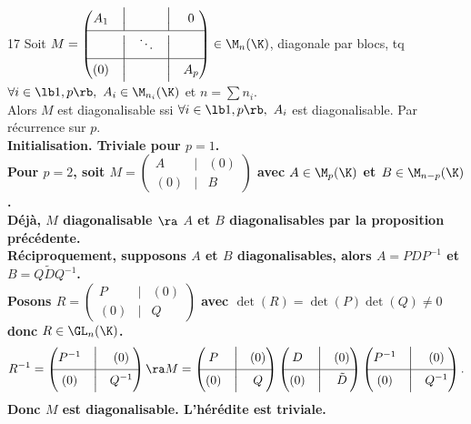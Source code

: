 \documentclass[11pt]{article}
\begin{document}
\begin{prop}{}{17}
    Soit $M=\begin{pmatrix}A_1 & \Big| & & \Big| & 0 \\ \hline & \Big| & \ddots & \Big| & \\ \hline (0) & \Big| & & \Big| & A_p\end{pmatrix}\in \M_n(\K)$, diagonale par blocs, tq $\forall i \in \lb1,p\rb, ~ A_i\in \M_{n_i}(\K)$ et $n=\sum n_i$.\\
    Alors $M$ est diagonalisable ssi $\forall i \in \lb1,p\rb, ~ A_i$ est diagonalisable. 
    \tcblower
    Par récurrence sur $p$.\\
    \bf{Initialisation.} Triviale pour $p=1$.\\
    Pour $p=2$, soit $M=\begin{pmatrix}A&\Big|&(0)\\\hline(0)&\Big|&B\end{pmatrix}$ avec $A\in\M_p(\K)$ et $B\in\M_{n-p}(\K)$.\\
    Déjà, $M$ diagonalisable $\ra$ $A$ et $B$ diagonalisables par la proposition précédente.\\
    Réciproquement, supposons $A$ et $B$ diagonalisables, alors $A=PDP^{-1}$ et $B=Q\tilde{D} Q^{-1}$.\\
    Posons $R=\begin{pmatrix}P&\Big|&(0)\\\hline(0)&\Big|& Q\end{pmatrix}$ avec $\det(R)=\det(P)\det(Q)\neq0$ donc $R\in\GL_n(\K)$.
    \begin{equation*}
        R^{-1}=\begin{pmatrix} P^{-1} & \Big| & (0) \\ \hline (0) & \Big| & Q^{-1} \end{pmatrix} \ra M = \begin{pmatrix}P & \Big| & (0) \\ \hline (0) & \Big| & Q \end{pmatrix} \begin{pmatrix} D & \Big| & (0) \\ \hline (0) & \Big| & \tilde{D} \end{pmatrix}\begin{pmatrix}P^{-1} & \Big| & (0) \\ \hline (0) & \Big| & Q^{-1}\end{pmatrix}.
    \end{equation*}
    Donc $M$ est diagonalisable. L'hérédite est triviale.
\end{prop}
\end{document}
